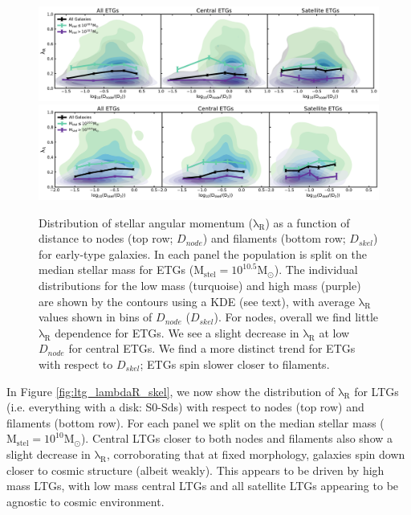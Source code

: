 \begin{figure}
    \centering\includegraphics[width=\linewidth]{thesis/latex/cw_spin/etg_lambdaR_dnode_mass_split_3sigma.pdf} \\
    \centering\includegraphics[width=\linewidth]{thesis/latex/cw_spin/etg_lambdaR_dskel_mass_split_3sigma.pdf}
    \caption{Distribution of stellar angular momentum ($\mathrm{\lambda_R}$) as a function of distance to nodes (top row; $D_{node}$) and filaments (bottom row; $D_{skel}$) for early-type galaxies. In each panel the population is split on the median stellar mass for ETGs ($\mathrm{M_{stel} = 10^{10.5}M_{\odot}}$). The individual distributions for the low mass (turquoise) and high mass (purple) are shown by the contours using a KDE (see text), with average $\mathrm{\lambda_R}$ values shown in bins of $D_{node}$ ($D_{skel}$). For nodes, overall we find little $\mathrm{\lambda_R}$ dependence for ETGs. We see a slight decrease in $\mathrm{\lambda_R}$ at low $D_{node}$ for central ETGs. We find a more distinct trend for ETGs with respect to $D_{skel}$; ETGs spin slower closer to filaments.}
\label{fig:etg_lambdaR_skel}
\end{figure} 

In Figure \ref{fig:ltg_lambdaR_skel}, we now show the distribution of $\mathrm{\lambda_R}$ for LTGs (i.e. everything with a disk: S0-Sds) with respect to nodes (top row) and filaments (bottom row). For each panel we split on the median stellar mass ($\mathrm{M_{stel} = 10^{10}M_{\odot}}$). Central LTGs closer to both nodes and filaments also show a slight decrease in $\mathrm{\lambda_R}$, corroborating that at fixed morphology, galaxies spin down closer to cosmic structure (albeit weakly). This appears to be driven by high mass LTGs, with low mass central LTGs and all satellite LTGs appearing to be agnostic to cosmic environment. 

